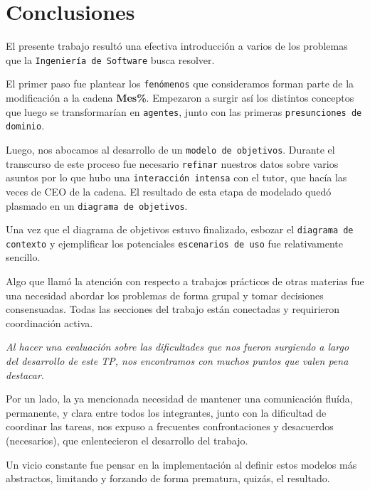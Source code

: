 
\section{Conclusiones}

El presente trabajo resultó una efectiva introducción a varios de los problemas
que la \texttt{Ingeniería de Software} busca resolver.

El primer paso fue plantear los \texttt{fenómenos} que consideramos forman parte
de la modificación a la cadena \textbf{Mes\%}. Empezaron a surgir así los
distintos conceptos que luego se transformarían en \texttt{agentes}, junto con
las primeras \texttt{presunciones de dominio}.

Luego, nos abocamos al desarrollo de un \texttt{modelo de objetivos}. Durante el
transcurso de este proceso fue necesario \texttt{refinar} nuestros datos sobre
varios asuntos por lo que hubo una \texttt{interacción intensa} con el tutor,
que hacía las veces de CEO de la cadena. El resultado de esta etapa de modelado
quedó plasmado en un \texttt{diagrama de objetivos}.

Una vez que el diagrama de objetivos estuvo finalizado, esbozar el
\texttt{diagrama de contexto} y ejemplificar los potenciales \texttt{escenarios
de uso} fue relativamente sencillo.

Algo que llamó la atención con respecto a trabajos prácticos de otras materias
fue una necesidad abordar los problemas de forma grupal y tomar decisiones
consensuadas. Todas las secciones del trabajo están conectadas y requirieron
coordinación activa.

\emph{Al hacer una evaluación sobre las dificultades que nos fueron surgiendo a
\lo largo del desarrollo de este TP, nos encontramos con muchos puntos que valen
\la pena destacar}.

Por un lado, la ya mencionada necesidad de mantener una comunicación fluída,
permanente, y clara entre todos los integrantes, junto con la dificultad de
coordinar las tareas, nos expuso a frecuentes confrontaciones y desacuerdos
(necesarios), que enlentecieron el desarrollo del trabajo.

Un vicio constante fue pensar en la implementación al definir estos modelos más
abstractos, limitando y forzando de forma prematura, quizás, el resultado.

